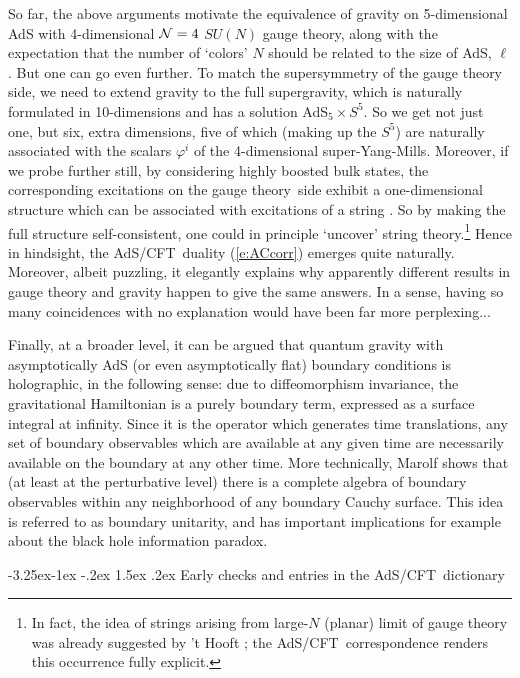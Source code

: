 \documentclass[12pt,a4paper]{article}
\makeatletter
\renewcommand\subsection{\@startsection{subsection}{2}{\z@}%
                                     {-3.25ex\@plus -1ex \@minus -.2ex}%
                                     {1.5ex \@plus .2ex}%
                                     {\normalfont\bfseries}}
\def\req#1{(\ref{#1})}
\def\AC{AdS/CFT}
\def\GT{gauge theory}
\def\SYM{super-Yang-Mills}
\def\adss#1#2{AdS$_{#1} \times S^{#2}$}
\def\Rads{\ell}
\def\ph{\varphi}
\makeatother
\begin{document}
So far, the above arguments motivate the equivalence of gravity on 5-dimensional AdS with 4-dimensional  ${\cal N}=4$ $SU(N)$ gauge theory, along with the expectation that the number of `colors' $N$ should be related to the size of AdS, $\Rads$.  But one can go even further.   
To match the supersymmetry of the gauge theory side, we need to extend gravity to the full supergravity, which is naturally formulated in 10-dimensions and has a solution \adss55.  So we get not just one, but six, extra dimensions, five of which (making up the $S^5$) are naturally associated with the scalars $\ph^i$ of the 4-dimensional \SYM.
Moreover, if we probe further still, by considering highly boosted bulk states, the corresponding excitations on the \GT\ side exhibit a one-dimensional structure which  can be associated with excitations of a string \cite{Berenstein:2002jq}.
 So by making the full structure self-consistent, one could in principle `uncover' string theory.\footnote{
 In fact, the idea of strings arising from large-$N$ (planar) limit of gauge theory  was already suggested by 't Hooft \cite{tHooft:1973jz}; the \AC\ correspondence renders this occurrence fully explicit.
}  Hence in hindsight, the \AC\ duality \req{e:ACcorr} emerges quite naturally.
Moreover, albeit puzzling, it elegantly explains why apparently different results in gauge theory and gravity happen to give the same answers.  In a sense, having so many coincidences with no explanation would have been far more perplexing...

Finally, at a broader level, it can be argued \cite{Marolf:2008mf} that quantum gravity with asymptotically AdS (or even asymptotically flat) boundary conditions is holographic, in the following sense: due to diffeomorphism invariance, the gravitational Hamiltonian is a purely boundary term, expressed as a surface integral at infinity.  Since it is the operator which generates time translations, any set of boundary observables which are available at any given time are necessarily available on the boundary at any other time.  More technically, Marolf  \cite{Marolf:2008mf} shows that (at least at the perturbative level) there is a complete algebra of boundary observables within any neighborhood of any boundary Cauchy surface.
This idea is referred to as boundary unitarity, and has important implications for example about the black hole information paradox.

\subsection{Early checks and entries in the \AC\ dictionary}
\label{s:ACdictionary}
\end{document}

